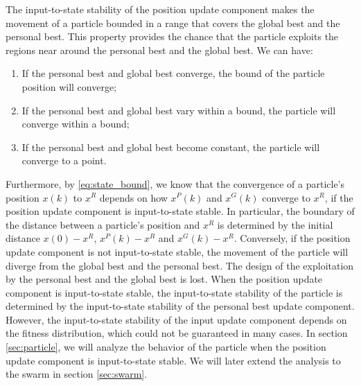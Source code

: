 The input-to-state stability of the position update component makes the movement of a particle bounded in a range that covers the global best and the personal best.
This property provides the chance that the particle exploits the regions near around the personal best and the global best.
We can have:
\begin{enumerate}
\item If the personal best and global best converge, the bound of the particle position will converge;
\item If the personal best and global best vary within a bound, the particle will converge within a bound;
\item If the personal best and global best become constant, the particle will converge to a point.
\end{enumerate}
Furthermore, by \eqref{eq:state_bound}, we know that the convergence of a particle's position $ x(k) $ to $ x^{R} $ depends on how $ x^{P}(k) $ and $ x^{G}(k) $ converge to $ x^{R} $, if the position update component is input-to-state stable.
In particular, the boundary of the distance between a particle's position and  $ x^{R} $ is determined by the initial distance $ x(0) -  x^{R} $, $ x^{P}(k) -  x^{R} $ and $ x^{G}(k) -  x^{R} $.
Conversely, if the position update component is not input-to-state stable, the movement of the particle will diverge from the global best and the personal best.
The design of the exploitation by the personal best and the global best is lost.
When the position update component is input-to-state stable, the input-to-state stability of the particle is determined by the input-to-state stability of the personal best update component.
However, the input-to-state stability of the input update component depends on the fitness distribution, which could not be guaranteed in many cases.
In section \ref{sec:particle}, we will analyze the behavior of the particle when the position update component is input-to-state stable.
We will later extend the analysis to the swarm in section \ref{sec:swarm}.



